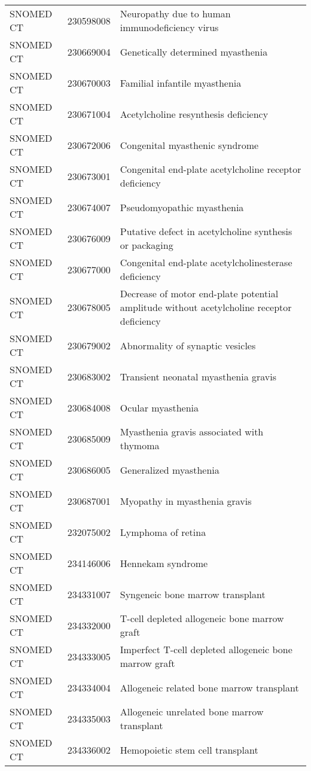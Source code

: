 \begin{table}[ht]
\begin{tabular}{lll}
  SNOMED CT & 230598008 & Neuropathy due to human immunodeficiency virus \\ 
  SNOMED CT & 230669004 & Genetically determined myasthenia \\ 
  SNOMED CT & 230670003 & Familial infantile myasthenia \\ 
  SNOMED CT & 230671004 & Acetylcholine resynthesis deficiency \\ 
  SNOMED CT & 230672006 & Congenital myasthenic syndrome \\ 
  SNOMED CT & 230673001 & Congenital end-plate acetylcholine receptor deficiency \\ 
  SNOMED CT & 230674007 & Pseudomyopathic myasthenia \\ 
  SNOMED CT & 230676009 & Putative defect in acetylcholine synthesis or packaging \\ 
  SNOMED CT & 230677000 & Congenital end-plate acetylcholinesterase deficiency \\ 
  SNOMED CT & 230678005 & Decrease of motor end-plate potential amplitude without acetylcholine receptor deficiency \\ 
  SNOMED CT & 230679002 & Abnormality of synaptic vesicles \\ 
  SNOMED CT & 230683002 & Transient neonatal myasthenia gravis \\ 
  SNOMED CT & 230684008 & Ocular myasthenia \\ 
  SNOMED CT & 230685009 & Myasthenia gravis associated with thymoma \\ 
  SNOMED CT & 230686005 & Generalized myasthenia \\ 
  SNOMED CT & 230687001 & Myopathy in myasthenia gravis \\ 
  SNOMED CT & 232075002 & Lymphoma of retina \\ 
  SNOMED CT & 234146006 & Hennekam syndrome \\ 
  SNOMED CT & 234331007 & Syngeneic bone marrow transplant \\ 
  SNOMED CT & 234332000 & T-cell depleted allogeneic bone marrow graft \\ 
  SNOMED CT & 234333005 & Imperfect T-cell depleted allogeneic bone marrow graft \\ 
  SNOMED CT & 234334004 & Allogeneic related bone marrow transplant \\ 
  SNOMED CT & 234335003 & Allogeneic unrelated bone marrow transplant \\ 
  SNOMED CT & 234336002 & Hemopoietic stem cell transplant \\ 

\end{tabular}
\end{table}
